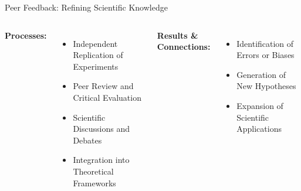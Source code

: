 \begin{frame}{Peer Feedback: Refining Scientific Knowledge}
  \begin{columns}
    \textbf{Processes:}
    \begin{itemize}
      \item Independent Replication of Experiments
      \item Peer Review and Critical Evaluation
      \item Scientific Discussions and Debates
      \item Integration into Theoretical Frameworks
    \end{itemize}

    \textbf{Results \& Connections:}
    \begin{itemize}
      \item Identification of Errors or Biases
      \item Generation of New Hypotheses
      \item Expansion of Scientific Applications
      \vspace{1.1cm}
    \end{itemize}
  \end{columns}
\end{frame}

